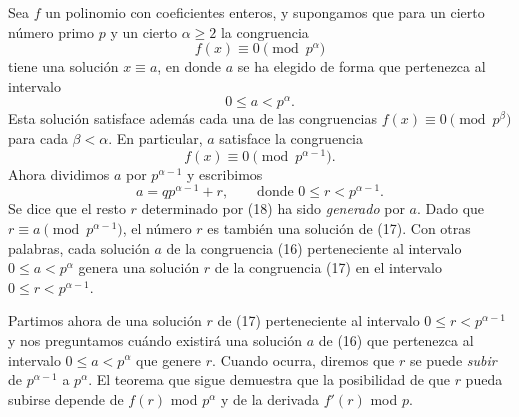 \documentclass[12pt,a4paper]{book}
\begin{document}
    Sea $f$ un polinomio con coeficientes enteros, y supongamos que para un cierto número
    primo $p$ y un cierto $\alpha\geq2$ la congruencia
    \begin{equation}
        f(x)\equiv0\pmod{p^{\alpha}}
    \end{equation}
    tiene una solución $x\equiv a$, en donde $a$ se ha elegido de forma que pertenezca al
    intervalo
    \begin{equation*}
        0\leq a<p^{\alpha}.
    \end{equation*}
    Esta solución satisface además cada una de las congruencias
    $f(x)\equiv0\pmod{p^{\beta}}$ para cada $\beta<\alpha$. En particular, $a$ satisface
    la congruencia
    \begin{equation}
        f(x)\equiv0\pmod{p^{\alpha-1}}.
    \end{equation}
    Ahora dividimos $a$ por $p^{\alpha-1}$ y escribimos
    \begin{equation}
        a=qp^{\alpha-1}+r,\qquad\text{donde }0\leq r<p^{\alpha-1}.
    \end{equation}
    Se dice que el resto $r$ determinado por (18) ha sido \textit{generado} por $a$. Dado
    que $r\equiv a\pmod{p^{\alpha-1}}$, el número $r$ es también una solución de (17).
    Con otras palabras, cada solución $a$ de la congruencia (16) perteneciente al
    intervalo $0\leq a<p^{\alpha}$ genera una solución $r$ de la congruencia (17) en el
    intervalo $0\leq r<p^{\alpha-1}$.

    Partimos ahora de una solución $r$ de (17) perteneciente al intervalo
    $0\leq r<p^{\alpha-1}$ y nos preguntamos cuándo existirá una solución $a$ de (16) que
    pertenezca al intervalo $0\leq a<p^{\alpha}$ que genere $r$. Cuando ocurra, diremos
    que $r$ se puede \textit{subir} de $p^{\alpha-1}$ a $p^{\alpha}$. El teorema que sigue
    demuestra que la posibilidad de que $r$ pueda subirse depende de $f(r)$ mod
    $p^{\alpha}$ y de la derivada $f'(r)$ mod $p$.
\end{document}
